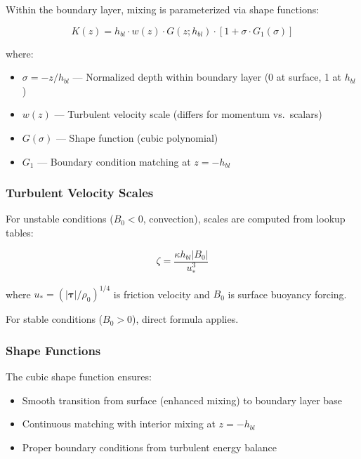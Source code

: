 \documentclass[11pt, a4paper]{article}
\begin{document}
Within the boundary layer, mixing is parameterized via shape functions:

\begin{equation}
K(z) = h_{bl} \cdot w(z) \cdot G(z; h_{bl}) \cdot [1 + \sigma \cdot G_1(\sigma)]
\end{equation}

where:

\begin{itemize}
    \item $\sigma = -z/h_{bl}$ — Normalized depth within boundary layer (0 at surface, 1 at $h_{bl}$)
    \item $w(z)$ — Turbulent velocity scale (differs for momentum vs.\ scalars)
    \item $G(\sigma)$ — Shape function (cubic polynomial)
    \item $G_1$ — Boundary condition matching at $z = -h_{bl}$
\end{itemize}

\subsubsection{Turbulent Velocity Scales}

For unstable conditions ($B_0 < 0$, convection), scales are computed from lookup tables:

\begin{equation}
\zeta = \frac{\kappa h_{bl} |B_0|}{u_*^3}
\end{equation}

where $u_* = (|\boldsymbol{\tau}|/\rho_0)^{1/4}$ is friction velocity and $B_0$ is surface buoyancy forcing.

For stable conditions ($B_0 > 0$), direct formula applies.

\subsubsection{Shape Functions}

The cubic shape function ensures:

\begin{itemize}
    \item Smooth transition from surface (enhanced mixing) to boundary layer base
    \item Continuous matching with interior mixing at $z = -h_{bl}$
    \item Proper boundary conditions from turbulent energy balance
\end{itemize}
\end{document}
